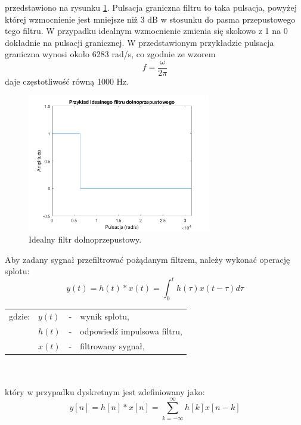 przedstawiono na rysunku \ref{rys:sub_lowpass}. Pulsacja graniczna filtru to taka pulsacja, powyżej której wzmocnienie jest mniejsze niż 3 dB w stosunku do pasma przepustowego tego filtru. W przypadku idealnym wzmocnienie zmienia się skokowo z 1 na 0 dokładnie na pulsacji granicznej. W przedstawionym przykładzie pulsacja graniczna wynosi około 6283 rad/s, co zgodnie ze wzorem
\begin{equation} \label{equ:sub_frequency}
f = \frac{\omega}{2 \pi}
\end{equation}
daje częstotliwość równą 1000 Hz.
\begin{figure}[H]
	\centering
	\includegraphics[width=8cm]{grafiki/sub_lowpass}
	\captionsetup{justification=centering}
	\caption{Idealny filtr dolnoprzepustowy.}
	\label{rys:sub_lowpass}
\end{figure}

Aby zadany sygnał przefiltrować pożądanym filtrem, należy wykonać operację splotu:
\begin{equation} \label{equ:sub_splot}
y(t)= h(t)*x(t) = \int_{0}^{t} h(\tau)x(t-\tau)d\tau
\end{equation}
\begin{tabular}{ l l l l}
	gdzie: & $y(t)$ &  - & wynik splotu, \\
	&	$h(t)$ & - &  odpowiedź impulsowa filtru,\\
	&	$x(t)$ & - &  filtrowany sygnał,\\
	
\end{tabular} \\ \\
który w przypadku dyskretnym jest zdefiniowany jako:
\begin{equation} \label{equ:sub_splot_dyskretny}
y[n]= h[n]*x[n] = \sum_{k=-\infty}^{\infty} h[k]x[n-k]
\end{equation}

